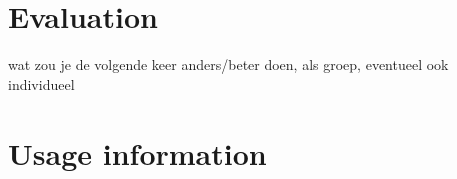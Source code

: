 
\section{Evaluation}
wat zou je de volgende keer anders/beter doen, als groep, eventueel ook individueel

\section{Usage information}

